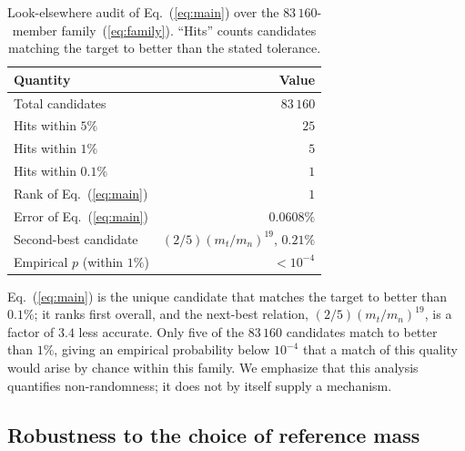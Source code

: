 \documentclass[aps,prd,twocolumn,amsmath,amssymb,floatfix,nofootinbib]{revtex4-2}
\begin{document}
\begin{table}[t]
\caption{Look-elsewhere audit of Eq.~(\ref{eq:main}) over the
$83\,160$-member family~(\ref{eq:family}). ``Hits'' counts candidates matching
the target to better than the stated tolerance.}
\label{tab:lookelsewhere}
\begin{ruledtabular}
\begin{tabular}{lr}
Quantity & Value \\
\hline
Total candidates & $83\,160$ \\
Hits within $5\%$ & $25$ \\
Hits within $1\%$ & $5$ \\
Hits within $0.1\%$ & $1$ \\
Rank of Eq.~(\ref{eq:main}) & $1$ \\
Error of Eq.~(\ref{eq:main}) & $0.0608\%$ \\
Second-best candidate & $(2/5)(m_t/m_n)^{19}$, $0.21\%$ \\
Empirical $p$ (within $1\%$) & $<10^{-4}$ \\
\end{tabular}
\end{ruledtabular}
\end{table}

Eq.~(\ref{eq:main}) is the unique candidate that matches the target to better
than $0.1\%$; it ranks first overall, and the next-best relation,
$(2/5)(m_t/m_n)^{19}$, is a factor of $3.4$ less accurate. Only five of the
$83\,160$ candidates match to better than $1\%$, giving an empirical
probability below $10^{-4}$ that a match of this quality would arise by chance
within this family. We emphasize that this analysis quantifies non-randomness;
it does not by itself supply a mechanism.

\subsection{Robustness to the choice of reference mass}
\label{sec:refmass}
\end{document}
